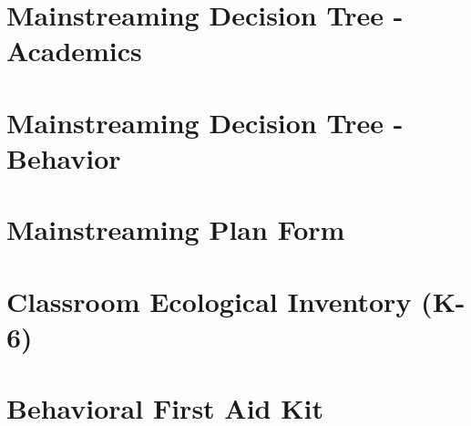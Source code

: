 \documentclass[twoside]{article}
\begin{document}
\printbibliography
\clearpage
\appendix
\appendixpage
\section{Mainstreaming Decision Tree - Academics}
\section{Mainstreaming Decision Tree - Behavior}
\section{Mainstreaming Plan Form}
\section{Classroom Ecological Inventory (K-6)}
\section{Behavioral First Aid Kit}
\label{Appendix1}

\label{Appendix2}

\label{Appendix3}

\clearpage \mbox{} \clearpage
\label{Appendix4}

\clearpage \mbox{} \clearpage
\label{Appendix5}

%
\end{document}
